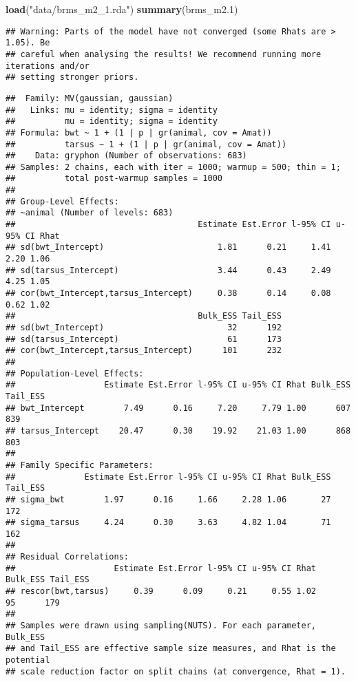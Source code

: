 \documentclass[12pt,]{book}
\newenvironment{Shaded}{\begin{snugshade}}{\end{snugshade}}
\newcommand{\FloatTok}[1]{\textcolor[rgb]{0.00,0.00,0.81}{#1}}
\newcommand{\KeywordTok}[1]{\textcolor[rgb]{0.13,0.29,0.53}{\textbf{#1}}}
\newcommand{\NormalTok}[1]{#1}
\newcommand{\StringTok}[1]{\textcolor[rgb]{0.31,0.60,0.02}{#1}}
\begin{document}
\begin{Shaded}
\begin{Highlighting}[]
\KeywordTok{load}\NormalTok{(}\StringTok{"data/brms_m2_1.rda"}\NormalTok{)}
\KeywordTok{summary}\NormalTok{(brms_m2}\FloatTok{.1}\NormalTok{)}
\end{Highlighting}
\end{Shaded}

\begin{verbatim}
## Warning: Parts of the model have not converged (some Rhats are > 1.05). Be
## careful when analysing the results! We recommend running more iterations and/or
## setting stronger priors.
\end{verbatim}

\begin{verbatim}
##  Family: MV(gaussian, gaussian) 
##   Links: mu = identity; sigma = identity
##          mu = identity; sigma = identity 
## Formula: bwt ~ 1 + (1 | p | gr(animal, cov = Amat)) 
##          tarsus ~ 1 + (1 | p | gr(animal, cov = Amat)) 
##    Data: gryphon (Number of observations: 683) 
## Samples: 2 chains, each with iter = 1000; warmup = 500; thin = 1;
##          total post-warmup samples = 1000
## 
## Group-Level Effects: 
## ~animal (Number of levels: 683) 
##                                     Estimate Est.Error l-95% CI u-95% CI Rhat
## sd(bwt_Intercept)                       1.81      0.21     1.41     2.20 1.06
## sd(tarsus_Intercept)                    3.44      0.43     2.49     4.25 1.05
## cor(bwt_Intercept,tarsus_Intercept)     0.38      0.14     0.08     0.62 1.02
##                                     Bulk_ESS Tail_ESS
## sd(bwt_Intercept)                         32      192
## sd(tarsus_Intercept)                      61      173
## cor(bwt_Intercept,tarsus_Intercept)      101      232
## 
## Population-Level Effects: 
##                  Estimate Est.Error l-95% CI u-95% CI Rhat Bulk_ESS Tail_ESS
## bwt_Intercept        7.49      0.16     7.20     7.79 1.00      607      839
## tarsus_Intercept    20.47      0.30    19.92    21.03 1.00      868      803
## 
## Family Specific Parameters: 
##              Estimate Est.Error l-95% CI u-95% CI Rhat Bulk_ESS Tail_ESS
## sigma_bwt        1.97      0.16     1.66     2.28 1.06       27      172
## sigma_tarsus     4.24      0.30     3.63     4.82 1.04       71      162
## 
## Residual Correlations: 
##                    Estimate Est.Error l-95% CI u-95% CI Rhat Bulk_ESS Tail_ESS
## rescor(bwt,tarsus)     0.39      0.09     0.21     0.55 1.02       95      179
## 
## Samples were drawn using sampling(NUTS). For each parameter, Bulk_ESS
## and Tail_ESS are effective sample size measures, and Rhat is the potential
## scale reduction factor on split chains (at convergence, Rhat = 1).
\end{verbatim}
\end{document}

